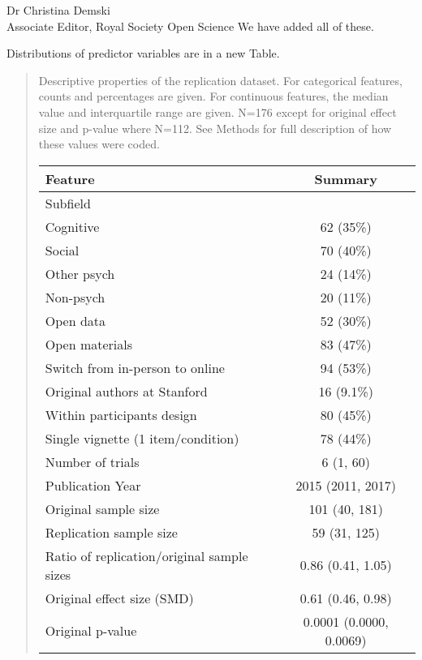 \documentclass{stanfordletter}
\newcommand{\revised}[1]{\begin{quote}	#1 \end{quote}}
\begin{document}
\begin{letter}{Dr Christina Demski \\ Associate Editor, Royal Society Open Science}
          We have added all of these.
          
          Distributions of predictor variables are in a new Table. 
          
          \revised{{Descriptive properties of the replication dataset. For categorical features, counts and percentages are given. For continuous features, the median value and interquartile range are given. N=176 except for original effect size and p-value where N=112. See Methods for full description of how these values were coded. }
          	{\centering
          	\fontsize{10}{12}\selectfont
          	\begin{tabular}[t]{lc}
          		\toprule
          		Feature & Summary\\
          		\midrule
          		Subfield & \\
          		\hspace{1em}Cognitive & 62 (35\%)\\
          		\hspace{1em}Social & 70 (40\%)\\
          		\hspace{1em}Other psych & 24 (14\%)\\
          		\hspace{1em}Non-psych & 20 (11\%)\\
          		Open data & 52 (30\%)\\
          		Open materials & 83 (47\%)\\
          		Switch from in-person to online & 94 (53\%)\\
          		Original authors at Stanford & 16 (9.1\%)\\
          		Within participants design & 80 (45\%)\\
          		Single vignette (1 item/condition) & 78 (44\%)\\
          		Number of trials & 6 (1, 60)\\
          		Publication Year & 2015 (2011, 2017)\\
          		Original sample size & 101 (40, 181)\\
          		Replication sample size & 59 (31, 125)\\
          		Ratio of replication/original sample sizes & 0.86 (0.41, 1.05)\\
          		Original effect size (SMD) & 0.61 (0.46, 0.98)\\
          		Original p-value & 0.0001 (0.0000, 0.0069)\\
          		\bottomrule
          	\end{tabular}}}
          

\end{letter}
\end{document}
